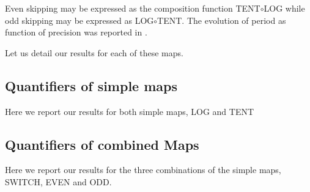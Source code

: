 Even skipping may be expressed as the composition function TENT$\circ$LOG while odd skipping may be expressed as LOG$\circ$TENT.
The evolution of period as function of precision was reported in \cite{Nagaraj2008}.

Let us detail our results for each of these maps.



\subsection {Quantifiers of simple maps}\label{subsec:SimpleMaps}
Here we report our results for both simple maps, LOG and TENT



 

\subsection{Quantifiers of combined Maps}\label{subsec:SecSwitch}
Here we report our results for the three combinations of the simple maps, SWITCH, EVEN and ODD.



